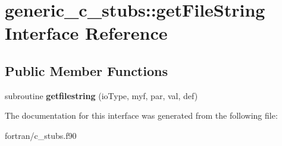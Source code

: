 \hypertarget{interfacegeneric__c__stubs_1_1get_file_string}{}\section{generic\+\_\+c\+\_\+stubs\+:\+:get\+File\+String Interface Reference}
\label{interfacegeneric__c__stubs_1_1get_file_string}
\subsection*{Public Member Functions}
\begin{DoxyCompactItemize}
\item 
\mbox{\label{interfacegeneric__c__stubs_1_1get_file_string_af080607bcd5b90453eeb243e6164b12c}} 
subroutine {\bfseries getfilestring} (io\+Type, myf, par, val, def)
\end{DoxyCompactItemize}


The documentation for this interface was generated from the following file\+:\begin{DoxyCompactItemize}
\item 
fortran/c\+\_\+stubs.\+f90\end{DoxyCompactItemize}
